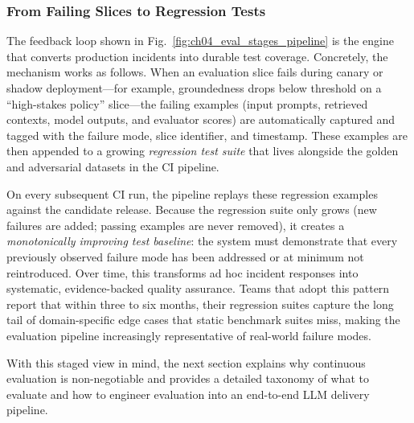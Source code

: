 \subsubsection{From Failing Slices to Regression Tests}\label{subsec:ch04-failing-slices-regression}

The feedback loop shown in Fig.~\ref{fig:ch04_eval_stages_pipeline} is the engine that converts production incidents into durable test coverage. Concretely, the mechanism works as follows. When an evaluation slice fails during canary or shadow deployment---for example, groundedness drops below threshold on a ``high-stakes policy'' slice---the failing examples (input prompts, retrieved contexts, model outputs, and evaluator scores) are automatically captured and tagged with the failure mode, slice identifier, and timestamp. These examples are then appended to a growing \emph{regression test suite} that lives alongside the golden and adversarial datasets in the CI pipeline.

On every subsequent CI run, the pipeline replays these regression examples against the candidate release. Because the regression suite only grows (new failures are added; passing examples are never removed), it creates a \emph{monotonically improving test baseline}: the system must demonstrate that every previously observed failure mode has been addressed or at minimum not reintroduced. Over time, this transforms ad hoc incident responses into systematic, evidence-backed quality assurance. Teams that adopt this pattern report that within three to six months, their regression suites capture the long tail of domain-specific edge cases that static benchmark suites miss, making the evaluation pipeline increasingly representative of real-world failure modes.

With this staged view in mind, the next section explains why continuous evaluation is non-negotiable and provides a detailed taxonomy of what to evaluate and how to engineer evaluation into an end-to-end LLM delivery pipeline.


